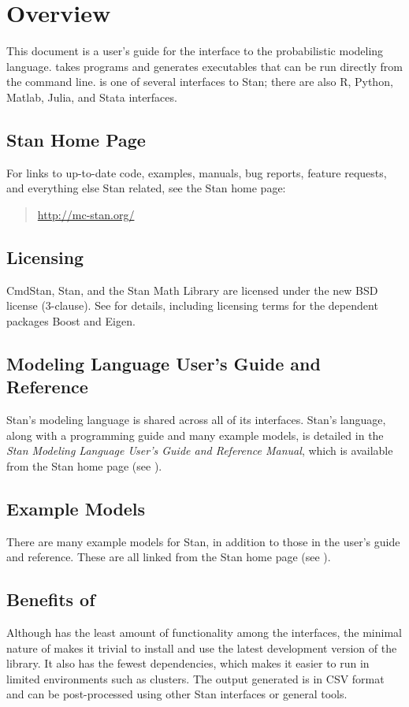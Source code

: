\chapter{Overview}

\noindent
This document is a user's guide for the \CmdStan interface to the
\Stan probabilistic modeling language. \CmdStan takes \Stan programs
and generates executables that can be run directly from the command
line. \CmdStan is one of several interfaces to Stan; there are also R,
Python, Matlab, Julia, and Stata interfaces.

\section{Stan Home Page}\label{home-page.section}

For links to up-to-date code, examples, manuals, bug reports, feature
requests, and everything else Stan related, see the Stan home page:
%
\begin{quote}
\url{http://mc-stan.org/}
\end{quote}


\section{Licensing}

CmdStan, Stan, and the Stan Math Library are licensed under the new
BSD license (3-clause).  See  for details,
including licensing terms for the dependent packages Boost and Eigen.


\section{Modeling Language User's Guide and Reference}

Stan's modeling language is shared across all of its interfaces.
Stan's language, along with a programming guide and many example
models, is detailed in the {\it Stan Modeling Language User's Guide
  and Reference Manual}, which is available from the Stan home page
(see ).

\section{Example Models}

There are many example models for Stan, in addition to those in the
user's guide and reference. These are all linked from the Stan home
page (see ).


\section{Benefits of \CmdStan}

Although \CmdStan has the least amount of functionality among the
\Stan interfaces, the minimal nature of \CmdStan makes it trivial to
install and use the latest development version of the \Stan
library. It also has the fewest dependencies, which makes it easier to
run in limited environments such as clusters. The output generated is
in CSV format and can be post-processed using other Stan interfaces or
general tools.
